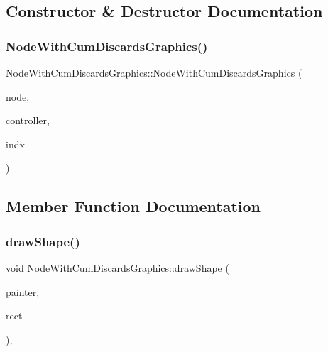 \subsection{Constructor \& Destructor Documentation}
\mbox{\label{class_node_with_cum_discards_graphics_a027b865d59070d0a522db59212017d84}} 
\subsubsection{\texorpdfstring{NodeWithCumDiscardsGraphics()}{NodeWithCumDiscardsGraphics()}}
{\footnotesize\ttfamily Node\+With\+Cum\+Discards\+Graphics\+::\+Node\+With\+Cum\+Discards\+Graphics (\begin{DoxyParamCaption}\item[{\mbox{\hyperlink{class_node_data}{Node\+Data}} $\ast$}]{node,  }\item[{\mbox{\hyperlink{class_map_objects_controller}{Map\+Objects\+Controller}} $\ast$}]{controller,  }\item[{int}]{indx }\end{DoxyParamCaption})\hspace{0.3cm}{\ttfamily [inline]}}



\subsection{Member Function Documentation}
\mbox{\label{class_node_with_cum_discards_graphics_a34470db668ac4cbf19d4c08fb6f222cb}} 
\subsubsection{\texorpdfstring{drawShape()}{drawShape()}}
{\footnotesize\ttfamily void Node\+With\+Cum\+Discards\+Graphics\+::draw\+Shape (\begin{DoxyParamCaption}\item[{Q\+Painter \&}]{painter,  }\item[{const qmapcontrol\+::\+Rect\+World\+Px \&}]{rect }\end{DoxyParamCaption})\hspace{0.3cm}{\ttfamily [protected]}, {\ttfamily [virtual]}}



